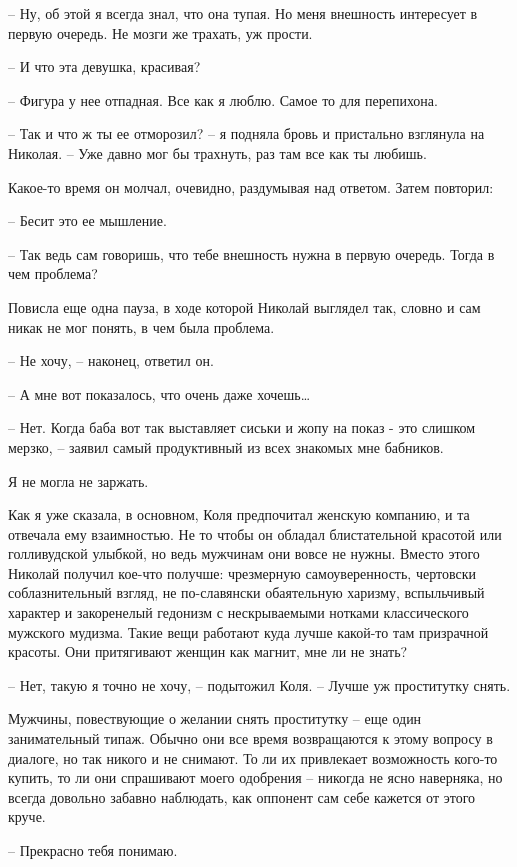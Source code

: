 \documentclass[
]{book}
\begin{document}
-- Ну, об этой я всегда знал, что она тупая. Но меня внешность интересует в первую очередь. Не мозги же трахать, уж прости.

-- И что эта девушка, красивая?

-- Фигура у нее отпадная. Все как я люблю. Самое то для перепихона.

-- Так и что ж ты ее отморозил? -- я подняла бровь и пристально взглянула на Николая. -- Уже давно мог бы трахнуть, раз там все как ты любишь.

Какое-то время он молчал, очевидно, раздумывая над ответом. Затем повторил:

-- Бесит это ее мышление.

-- Так ведь сам говоришь, что тебе внешность нужна в первую очередь. Тогда в чем проблема?

Повисла еще одна пауза, в ходе которой Николай выглядел так, словно и сам никак не мог понять, в чем была проблема.

-- Не хочу, -- наконец, ответил он.

-- А мне вот показалось, что очень даже хочешь\ldots{}

-- Нет. Когда баба вот так выставляет сиськи и жопу на показ - это слишком мерзко, -- заявил самый продуктивный из всех знакомых мне бабников.

Я не могла не заржать.

Как я уже сказала, в основном, Коля предпочитал женскую компанию, и та отвечала ему взаимностью. Не то чтобы он обладал блистательной красотой или голливудской улыбкой, но ведь мужчинам они вовсе не нужны. Вместо этого Николай получил кое-что получше: чрезмерную самоуверенность, чертовски соблазнительный взгляд, не по-славянски обаятельную харизму, вспыльчивый характер и закоренелый гедонизм с нескрываемыми нотками классического мужского мудизма. Такие вещи работают куда лучше какой-то там призрачной красоты. Они притягивают женщин как магнит, мне ли не знать?

-- Нет, такую я точно не хочу, -- подытожил Коля. -- Лучше уж проститутку снять.

Мужчины, повествующие о желании снять проститутку -- еще один занимательный типаж. Обычно они все время возвращаются к этому вопросу в диалоге, но так никого и не снимают. То ли их привлекает возможность кого-то купить, то ли они спрашивают моего одобрения -- никогда не ясно наверняка, но всегда довольно забавно наблюдать, как оппонент сам себе кажется от этого круче.

-- Прекрасно тебя понимаю.
\end{document}
